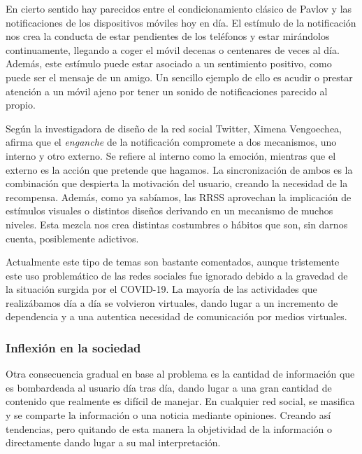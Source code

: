 \vspace{0.3cm}

En cierto sentido hay parecidos entre el condicionamiento clásico de Pavlov y las notificaciones de los dispositivos móviles hoy en día. El estímulo de la notificación nos crea la conducta de estar pendientes de los teléfonos y estar mirándolos continuamente, llegando a coger el móvil decenas o centenares de veces al día. Además, este estímulo puede estar asociado a un sentimiento positivo, como puede ser el mensaje de un amigo. Un sencillo ejemplo de ello es acudir o prestar atención a un móvil ajeno por tener un sonido de notificaciones parecido al propio.

\vspace{0.3cm}

Según la investigadora de diseño de la red social Twitter, Ximena Vengoechea, afirma que el \textit{enganche} de la notificación compromete a dos mecanismos, uno interno y otro externo. \cite{Xataka-RRSS-AS} Se refiere al interno como la emoción, mientras que el externo es la acción que pretende que hagamos. La sincronización de ambos es la combinación que despierta la motivación del usuario, creando la necesidad de la recompensa. Además, como ya sabíamos, las \acs{RRSS} aprovechan la implicación de estímulos visuales o distintos diseños derivando en un mecanismo de muchos niveles. Esta mezcla nos crea distintas costumbres o hábitos que son, sin darnos cuenta, posiblemente adictivos.

\vspace{0.3cm}

Actualmente este tipo de temas son bastante comentados, aunque tristemente este uso problemático de las redes sociales fue ignorado debido a la gravedad de la situación surgida por el COVID-19. La mayoría de las actividades que realizábamos día a día se volvieron virtuales, dando lugar a un incremento de dependencia y a una autentica necesidad de comunicación por medios virtuales.

\subsubsection{Inflexión en la sociedad}

Otra consecuencia gradual en base al problema es la cantidad de información que es bombardeada al usuario día tras día, dando lugar a una gran cantidad de contenido que realmente es difícil de manejar. En cualquier red social, se masifica y se comparte la información o una noticia mediante opiniones. Creando así tendencias, pero quitando de esta manera la objetividad de la información o directamente dando lugar a su mal interpretación.

